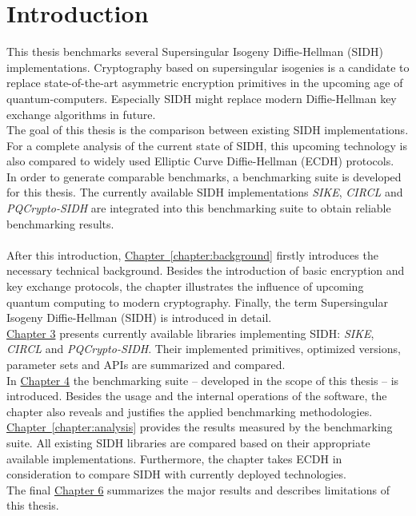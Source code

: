 \chapter{Introduction}\label{chapter:introduction}

This thesis benchmarks several Supersingular Isogeny Diffie-Hellman (\gls{SIDH}) implementations. Cryptography based on supersingular isogenies is a candidate to replace state-of-the-art asymmetric encryption primitives in the upcoming age of quantum-computers. Especially \gls{SIDH} might replace modern Diffie-Hellman key exchange algorithms in future.\\
The goal of this thesis is the comparison between existing \gls{SIDH} implementations. For a complete analysis of the current state of \gls{SIDH}, this upcoming technology is also compared to widely used Elliptic Curve Diffie-Hellman (\gls{ECDH}) protocols.\\
In order to generate comparable benchmarks, a benchmarking suite is developed for this thesis. The currently available \gls{SIDH} implementations \textit{\gls{SIKE}}, \textit{\gls{CIRCL}} and \textit{\gls{PQCrypto-SIDH}} are integrated into this benchmarking suite to obtain reliable benchmarking results.
\\\\
After this introduction, \hyperref[chapter:background]{Chapter~\ref*{chapter:background}} firstly introduces the necessary technical background. Besides the introduction of basic encryption and key exchange protocols, the chapter illustrates the influence of upcoming quantum computing to modern cryptography. Finally, the term Supersingular Isogeny Diffie-Hellman (\gls{SIDH}) is introduced in detail.\\
\hyperref[chapter:existing_sidh]{Chapter 3} presents currently available libraries implementing \gls{SIDH}: \textit{\gls{SIKE}}, \textit{\gls{CIRCL}} and \textit{\gls{PQCrypto-SIDH}}. Their implemented primitives, optimized versions, parameter sets and APIs are summarized and compared.\\
In \hyperref[chapter:benchmarking_suite]{Chapter 4} the benchmarking suite -- developed in the scope of this thesis -- is introduced. Besides the usage and the internal operations of the software, the chapter also reveals and justifies the applied benchmarking methodologies.\\
\hyperref[chapter:analysis]{Chapter~\ref*{chapter:analysis}} provides the results measured by the benchmarking suite. All existing \gls{SIDH} libraries are compared based on their appropriate available implementations. Furthermore, the chapter takes \gls{ECDH} in consideration to compare \gls{SIDH} with currently deployed technologies.\\
The final \hyperref[chapter:conclusion]{Chapter 6} summarizes the major results and describes limitations of this thesis.